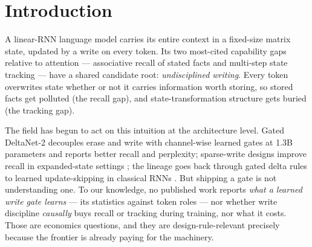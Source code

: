 \documentclass[10pt]{article}
\begin{document}
\begin{abstract}
training, repairs them in hybrid tasks, and deletes skills in LM training, where the write path is
how skills form. Finally, a zero-training, pre-registered follow-up measurement on a production
hybrid (Nemotron-Flash-3B, re-implemented torch-native) closes the scale question in both
directions: the production model's write knobs \emph{already} implement novelty-based hygiene ---
repeated facts are written more weakly than position-matched novel facts by $\tgProdDnDiff$
(deltanet $\beta$) and $\tgProdMtDiff$ (mamba2 $\Delta_t$), and our synthetic operation tokens are
write-suppressed out-of-distribution --- so the price is a small-scale scaffold for what
production-scale training discovers by default, and the surviving design rule is to \emph{measure}
hygiene, not necessarily to price it. All predictions, kills, and analysis rules were
pre-registered in-repository before any run; deviations are disclosed, and every number in this
paper regenerates from committed run artifacts.
\end{abstract}

\section{Introduction}
A linear-RNN language model carries its entire context in a fixed-size matrix state, updated by a
write on every token. Its two most-cited capability gaps relative to attention --- associative
recall of stated facts \citep{arora2023zoology} and multi-step state tracking
\citep{merrill2024illusion,grazzi2025negative} --- have a shared candidate root: \emph{undisciplined
writing}. Every token overwrites state whether or not it carries information worth storing, so
stored facts get polluted (the recall gap), and state-transformation structure gets buried
(the tracking gap).

The field has begun to act on this intuition at the architecture level. Gated DeltaNet-2
\citep{hatamizadeh2026gdn2} decouples erase and write with channel-wise learned gates at 1.3B
parameters and reports better recall and perplexity; sparse-write designs improve recall in
expanded-state settings \citep{pan2025sse,xiao2026ramnet}; the lineage goes back through gated delta
rules \citep{yang2025gateddeltanet,yang2024deltanet,gu2023mamba} to learned update-skipping in
classical RNNs \citep{campos2018skiprnn}. But shipping a gate is not understanding one. To our
knowledge, no published work reports \emph{what a learned write gate learns} --- its statistics
against token roles --- nor whether write discipline \emph{causally} buys recall or tracking during
training, nor what it costs. Those are economics questions, and they are design-rule-relevant
precisely because the frontier is already paying for the machinery.
\end{document}
